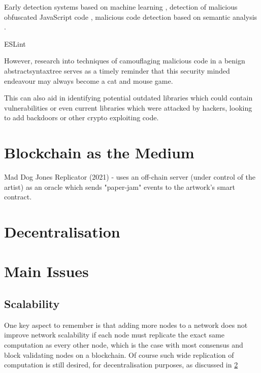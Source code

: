 Early detection systems based on machine learning \cite{schuttEarlyDetectionMalicious2012}, detection of malicious obfuscated JavaScript code \cite{likarishObfuscatedMaliciousJavascript2009} \cite{fassJaStFullySyntactic2018}, malicious code detection based on semantic analysis \cite{fangDetectingMaliciousJavaScript2020}.


\todo ESLint


However, research into techniques of camouflaging malicious code in a benign \gls{abstractsyntaxtree}
\cite{fassHideNoSeekCamouflagingMalicious2019} serves as a timely reminder that this security minded endeavour may always become a cat and mouse game.


This can also aid in identifying potential outdated libraries which could contain vulnerabilities or even current libraries which were attacked by hackers, looking to add backdoors or other crypto exploiting code.







\section{Blockchain as the Medium}

Mad Dog Jones Replicator (2021) - uses an off-chain server (under control of the artist) as an oracle which sends "paper-jam" events to the artwork's smart contract.

\section{Decentralisation}
\label{sec:lit_review:decentralisation}

\section{Main Issues}

\subsection{Scalability}

One key aspect to remember is that adding more nodes to a network does not improve network scalability if each node must replicate the exact same computation as every other node, which is the case with most consensus and block validating nodes on a blockchain. Of course such wide replication of computation is still desired, for decentralisation purposes, as discussed in \ref{sec:lit_review:decentralisation}


